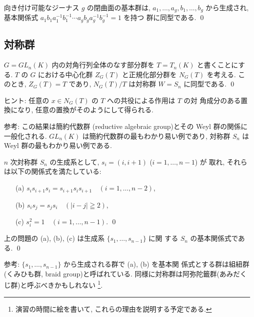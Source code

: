 \documentclass[12pt,twoside]{jarticle}
\def\Sym{S}
\begin{document}
\begin{question}
  向き付け可能なジーナス $g$ の閉曲面の基本群は, 
  $a_1,\dots,a_g,b_1,\dots,b_g$ から生成され,
  基本関係式 $a_1b_1a_1^{-1}b_1^{-1}\cdots a_gb_ga_g^{-1}b_g^{-1}=1$ を持つ
  群に同型である. \qed
\end{question}


\subsection{対称群}
\label{ss:symmetric}

\begin{question}[一般線形群と対称群の関係]
  $G = GL_n(K)$ 内の対角行列全体のなす部分群を $T=T_n(K)$ と書くことにする.
  $T$ の $G$ における中心化群 $Z_G(T)$ と正規化部分群を $N_G(T)$ を考える.
  このとき, $Z_G(T)=T$ であり, $N_G(T)/T$ は対称群 $W=\Sym_n$ に同型である.
  \qed 
\end{question}

\noindent ヒント: 任意の $x \in N_G(T)$ の $T$ への共役による作用は $T$ の対
角成分のある置換になり, 任意の置換がそのようにして得られる. 

\medskip

\noindent 参考: この結果は簡約代数群 (reductive algebraic group)とその Weyl 
群の関係に一般化される. $GL_n(K)$ は簡約代数群の最もわかり易い例であり, 
対称群 $\Sym_n$ は Weyl 群の最もわかり易い例である.

\medskip

\begin{question}
  $n$ 次対称群 $\Sym_n$ の生成系として, $s_i = (i,i+1)$ ($i=1,\dots,n-1$) が
  取れ, それらは以下の関係式を満たしている:
  \begin{itemize}
  \item[(a)] $s_is_{i+1}s_i = s_{i+1}s_is_{i+1} \quad (i=1,\dots,n-2)$,
  \item[(b)] $s_is_j=s_js_i \quad (|i-j|\geqq2)$,
  \item[(c)] $s_i^2 = 1 \quad (i=1,\dots,n-1)$.
  \qed
  \end{itemize}
\end{question}

\begin{question}
  上の問題の (a), (b), (c) は生成系 $\{s_1,\dots,s_{n-1}\}$ に関
  する $\Sym_n$ の基本関係式である. \qed
\end{question}

\noindent 参考: $\{s_1,\dots,s_{n-1}\}$ から生成される群で (a), (b) を基本関
係式とする群は組紐群(くみひも群, braid group)と呼ばれている. 
同様に対称群は阿弥陀籤群(あみだくじ群)と呼ぶべきかもしれない%
\footnote{演習の時間に絵を書いて, これらの理由を説明する予定である.}.
\end{document}
